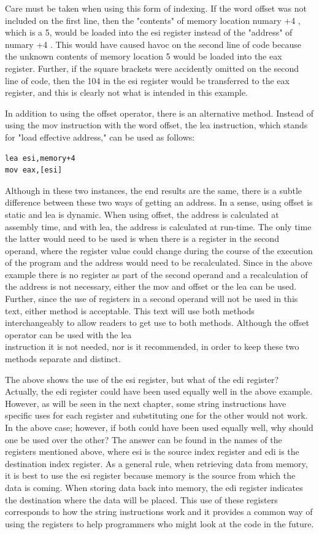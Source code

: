 \documentclass[10pt]{article}
\begin{document}
Care must be taken when using this form of indexing. If the word offset was not included on the first line, then the "contents" of memory location numary +4 , which is a 5, would be loaded into the esi register instead of the "address" of numary +4 . This would have caused havoc on the second line of code because the unknown contents of memory location 5 would be loaded into the eax register. Further, if the square brackets were accidently omitted on the second line of code, then the 104 in the esi register would be transferred to the eax register, and this is clearly not what is intended in this example.

In addition to using the offset operator, there is an alternative method. Instead of using the mov instruction with the word offset, the lea instruction, which stands for "load effective address," can be used as follows:

\begin{verbatim}
lea esi,memory+4
mov eax,[esi]
\end{verbatim}

Although in these two instances, the end results are the same, there is a subtle difference between these two ways of getting an address. In a sense, using offset is static and lea is dynamic. When using offset, the address is calculated at assembly time, and with lea, the address is calculated at run-time. The only time the latter would need to be used is when there is a register in the second operand, where the register value could change during the course of the execution of the program and the address would need to be recalculated. Since in the above example there is no register as part of the second operand and a recalculation of the address is not necessary, either the mov and offset or the lea can be used. Further, since the use of registers in a second operand will not be used in this text, either method is acceptable. This text will use both methods interchangeably to allow readers to get use to both methods. Although the offset operator can be used with the lea\\
instruction it is not needed, nor is it recommended, in order to keep these two methods separate and distinct.

The above shows the use of the esi register, but what of the edi register? Actually, the edi register could have been used equally well in the above example. However, as will be seen in the next chapter, some string instructions have specific uses for each register and substituting one for the other would not work. In the above case; however, if both could have been used equally well, why should one be used over the other? The answer can be found in the names of the registers mentioned above, where esi is the source index register and edi is the destination index register. As a general rule, when retrieving data from memory, it is best to use the esi register because memory is the source from which the data is coming. When storing data back into memory, the edi register indicates the destination where the data will be placed. This use of these registers corresponds to how the string instructions work and it provides a common way of using the registers to help programmers who might look at the code in the future.
\end{document}
